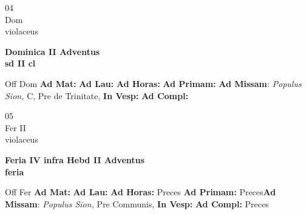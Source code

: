 \documentclass[10pt, openany]{book}
\begin{document}
    \begin{center}
        \begin{minipage}{3.5in}
            \vspace{2em}
            \begin{minipage}{0.5in}
                {\Huge 04} \\
                {\normalsize Dom} \\
                {\normalsize violaceus}
            \end{minipage}
            \begin{minipage}{3.0in}
                \textbf{ \large Dominica II Adventus \\
                \textnormal{\normalsize sd II cl}} \\ 
            \end{minipage}
            \begin{justify}Off Dom
                \textbf{Ad Mat: }
                \textbf{Ad Lau: }
                \textbf{Ad Horas: }
                \textbf{Ad Primam: }\textbf{Ad Missam}: \textit{Populus Sion,} C, Pre de Trinitate,  
                \textbf{In Vesp: }
                \textbf{Ad Compl: }
            \end{justify}
        \end{minipage}
    \end{center}

    \begin{center}
        \begin{minipage}{3.5in}
            \vspace{2em}
            \begin{minipage}{0.5in}
                {\Huge 05} \\
                {\normalsize Fer II} \\
                {\normalsize violaceus}
            \end{minipage}
            \begin{minipage}{3.0in}
                \textbf{ \large Feria IV infra Hebd II Adventus \\
                \textnormal{\normalsize feria}} \\ 
            \end{minipage}
            \begin{justify}Off Fer
                \textbf{Ad Mat: }
                \textbf{Ad Lau: }
                \textbf{Ad Horas: }Preces
                \textbf{Ad Primam: }Preces\textbf{Ad Missam}: \textit{Populus Sion,} Pre Communis,  
                \textbf{In Vesp: }
                \textbf{Ad Compl: }Preces
            \end{justify}
        \end{minipage}
    \end{center}
\end{document}
